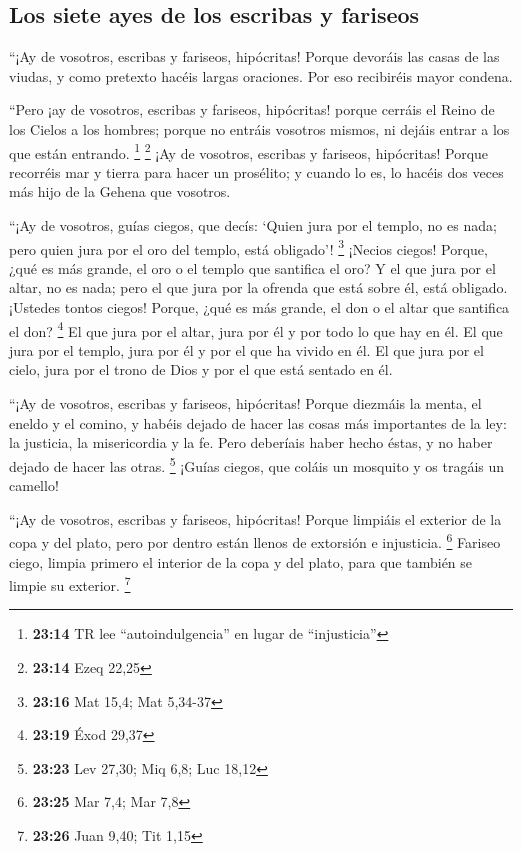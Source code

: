 \hypertarget{los-siete-ayes-de-los-escribas-y-fariseos}{%
\subsection{Los siete ayes de los escribas y
fariseos}\label{los-siete-ayes-de-los-escribas-y-fariseos}}

 ``¡Ay de vosotros, escribas y fariseos, hipócritas!
Porque devoráis las casas de las viudas, y como pretexto hacéis largas
oraciones. Por eso recibiréis mayor condena.

 ``Pero ¡ay de vosotros, escribas y fariseos, hipócritas!
porque cerráis el Reino de los Cielos a los hombres; porque no entráis
vosotros mismos, ni dejáis entrar a los que están entrando. \footnote{\textbf{23:14}
  TR lee ``autoindulgencia'' en lugar de ``injusticia''} \footnote{\textbf{23:14}
  Ezeq 22,25}  ¡Ay de vosotros, escribas y fariseos,
hipócritas! Porque recorréis mar y tierra para hacer un prosélito; y
cuando lo es, lo hacéis dos veces más hijo de la Gehena que vosotros.

 ``¡Ay de vosotros, guías ciegos, que decís: `Quien jura
por el templo, no es nada; pero quien jura por el oro del templo, está
obligado'! \footnote{\textbf{23:16} Mat 15,4; Mat 5,34-37}
 ¡Necios ciegos! Porque, ¿qué es más grande, el oro o el
templo que santifica el oro?  Y el que jura por el altar,
no es nada; pero el que jura por la ofrenda que está sobre él, está
obligado.  ¡Ustedes tontos ciegos! Porque, ¿qué es más
grande, el don o el altar que santifica el don? \footnote{\textbf{23:19}
  Éxod 29,37}  El que jura por el altar, jura por él y
por todo lo que hay en él.  El que jura por el templo,
jura por él y por el que ha vivido en él.  El que jura
por el cielo, jura por el trono de Dios y por el que está sentado en él.

 ``¡Ay de vosotros, escribas y fariseos, hipócritas!
Porque diezmáis la menta, el eneldo y el comino, y habéis dejado de
hacer las cosas más importantes de la ley: la justicia, la misericordia
y la fe. Pero deberíais haber hecho éstas, y no haber dejado de hacer
las otras. \footnote{\textbf{23:23} Lev 27,30; Miq 6,8; Luc 18,12}
 ¡Guías ciegos, que coláis un mosquito y os tragáis un
camello!

 ``¡Ay de vosotros, escribas y fariseos, hipócritas!
Porque limpiáis el exterior de la copa y del plato, pero por dentro
están llenos de extorsión e injusticia. \footnote{\textbf{23:25} Mar
  7,4; Mar 7,8}  Fariseo ciego, limpia primero el
interior de la copa y del plato, para que también se limpie su exterior.
\footnote{\textbf{23:26} Juan 9,40; Tit 1,15}

